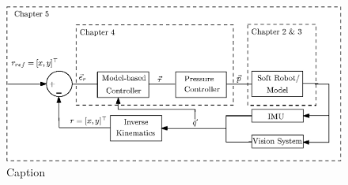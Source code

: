 \begin{figure}[H]
    \centering
    \includegraphics[width = \textwidth]{Figures/Chapter1/controlschemeComplete.eps}
    \caption{Caption}
    \label{fig:my_label}
\end{figure}







